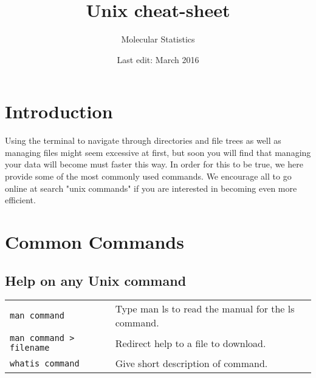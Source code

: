 \documentclass{article}
\title{Unix cheat-sheet}
\author{Molecular Statistics}
\date{Last edit: March 2016}
\begin{document}
\newcommand{\ti}[1]{\texttt{\textit{#1}}}
\renewcommand{\arraystretch}{2}


\maketitle

\section{Introduction}
Using the terminal to navigate through directories and file trees as well as managing files might seem excessive at first, but soon you will find that managing your data will become must faster this way. In order for this to be true, we here provide some of the most commonly used commands. We encourage all to go online at search "unix commands" if you are interested in becoming even more efficient. 

\section{Common Commands}
\subsection{Help on any Unix command}
\begin{table}[h]
\begin{tabular}{ll}
 	\texttt{man {command}} &	Type man ls to read the manual for the ls command. \\
	\texttt{man {command} > {filename}} &	Redirect help to a file to download. \\
	\texttt{whatis {command}} &	Give short description of command.\\
\end{tabular}
\end{table}
\end{document}
